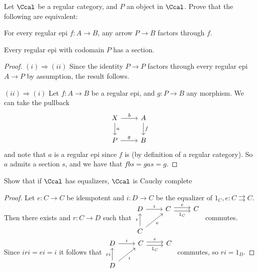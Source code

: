 \begin{exercise}{9}
    Let $\Ccal$ be a regular category, and $P$ an object in $\Ccal$. Prove that the following are equivalent:
    \begin{equivalent}
        \item For every regular epi $f\colon A\to B$, any arrow $P\to B$ factors through $f$.
        \item Every regular epi with codomain $P$ has a section.
    \end{equivalent}
\begin{solution}
    \begin{proof}
        $(i)\Rightarrow(ii)$ Since the identity $P\to P$ factors through every regular epi $A\to P$ by assumption, the result follows.

        $(ii)\Rightarrow (i)$ Let $f\colon A\to B$ be a regular epi, and $g\colon P\to B$ any morphism. We can take the pullback
        \[ \begin{tikzcd}
            X \arrow[d, "a"] \arrow[r, "b"] & A \arrow[d, "f"] \\
            P \arrow[r, "g"]                & B               
        \end{tikzcd} \]
        and note that $a$ is a regular epi since $f$ is (by definition of a regular category). So $a$ admits a section $s$, and we have that $fbs=gas=g$.
    \end{proof}
\end{solution}
\end{exercise}

\begin{exercise}{10}
    Show that if $\Ccal$ has equalizers, $\Ccal$ is Cauchy complete
\begin{solution}
    \begin{proof}
        Let $e\colon C\to C$ be idempotent and $i\colon D\to C$ be the equalizer of $1_C,e\colon C\rightrightarrows C$. Then there exists and $r\colon C\to D$ such that 
        $\begin{tikzcd}
            D \arrow[r, "i"]                  & C \arrow[r, "e", shift left] \arrow[r, "1_C"', shift right] & C \\
            C \arrow[ru, "e"'] \arrow[u, "r"] &                                                             &  
        \end{tikzcd}$ 
        commutes. Since $iri=ei=i$ it follows that 
        $\begin{tikzcd}
            D \arrow[r, "i"]                   & C \arrow[r, "e", shift left] \arrow[r, "1_C"', shift right] & C \\
            D \arrow[u, "ri"] \arrow[ru, "i"'] &                                                             &  
        \end{tikzcd}$
        commutes, so $ri=1_D$.
    \end{proof}
\end{solution}
\end{exercise}

